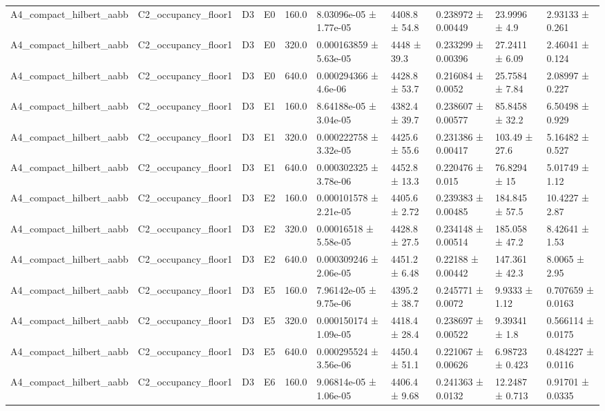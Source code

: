 \begin{table}
\begin{tabular}{llllllllll}
A4\_compact\_hilbert\_aabb & C2\_occupancy\_floor1 & D3 & E0 & 160.0 & 8.03096e-05 ± 1.77e-05 & 4408.8 ± 54.8 & 0.238972 ± 0.00449 & 23.9996 ± 4.9 & 2.93133 ± 0.261 \\
A4\_compact\_hilbert\_aabb & C2\_occupancy\_floor1 & D3 & E0 & 320.0 & 0.000163859 ± 5.63e-05 & 4448 ± 39.3 & 0.233299 ± 0.00396 & 27.2411 ± 6.09 & 2.46041 ± 0.124 \\
A4\_compact\_hilbert\_aabb & C2\_occupancy\_floor1 & D3 & E0 & 640.0 & 0.000294366 ± 4.6e-06 & 4428.8 ± 53.7 & 0.216084 ± 0.0052 & 25.7584 ± 7.84 & 2.08997 ± 0.227 \\
A4\_compact\_hilbert\_aabb & C2\_occupancy\_floor1 & D3 & E1 & 160.0 & 8.64188e-05 ± 3.04e-05 & 4382.4 ± 39.7 & 0.238607 ± 0.00577 & 85.8458 ± 32.2 & 6.50498 ± 0.929 \\
A4\_compact\_hilbert\_aabb & C2\_occupancy\_floor1 & D3 & E1 & 320.0 & 0.000222758 ± 3.32e-05 & 4425.6 ± 55.6 & 0.231386 ± 0.00417 & 103.49 ± 27.6 & 5.16482 ± 0.527 \\
A4\_compact\_hilbert\_aabb & C2\_occupancy\_floor1 & D3 & E1 & 640.0 & 0.000302325 ± 3.78e-06 & 4452.8 ± 13.3 & 0.220476 ± 0.015 & 76.8294 ± 15 & 5.01749 ± 1.12 \\
A4\_compact\_hilbert\_aabb & C2\_occupancy\_floor1 & D3 & E2 & 160.0 & 0.000101578 ± 2.21e-05 & 4405.6 ± 2.72 & 0.239383 ± 0.00485 & 184.845 ± 57.5 & 10.4227 ± 2.87 \\
A4\_compact\_hilbert\_aabb & C2\_occupancy\_floor1 & D3 & E2 & 320.0 & 0.00016518 ± 5.58e-05 & 4428.8 ± 27.5 & 0.234148 ± 0.00514 & 185.058 ± 47.2 & 8.42641 ± 1.53 \\
A4\_compact\_hilbert\_aabb & C2\_occupancy\_floor1 & D3 & E2 & 640.0 & 0.000309246 ± 2.06e-05 & 4451.2 ± 6.48 & 0.22188 ± 0.00442 & 147.361 ± 42.3 & 8.0065 ± 2.95 \\
A4\_compact\_hilbert\_aabb & C2\_occupancy\_floor1 & D3 & E5 & 160.0 & 7.96142e-05 ± 9.75e-06 & 4395.2 ± 38.7 & 0.245771 ± 0.0072 & 9.9333 ± 1.12 & 0.707659 ± 0.0163 \\
A4\_compact\_hilbert\_aabb & C2\_occupancy\_floor1 & D3 & E5 & 320.0 & 0.000150174 ± 1.09e-05 & 4418.4 ± 28.4 & 0.238697 ± 0.00522 & 9.39341 ± 1.8 & 0.566114 ± 0.0175 \\
A4\_compact\_hilbert\_aabb & C2\_occupancy\_floor1 & D3 & E5 & 640.0 & 0.000295524 ± 3.56e-06 & 4450.4 ± 51.1 & 0.221067 ± 0.00626 & 6.98723 ± 0.423 & 0.484227 ± 0.0116 \\
A4\_compact\_hilbert\_aabb & C2\_occupancy\_floor1 & D3 & E6 & 160.0 & 9.06814e-05 ± 1.06e-05 & 4406.4 ± 9.68 & 0.241363 ± 0.0132 & 12.2487 ± 0.713 & 0.91701 ± 0.0335 \\

\end{tabular}
\end{table}
